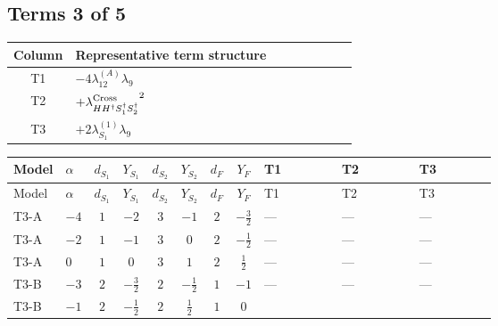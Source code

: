 \documentclass[8pt]{article}
\begin{document}
\begin{landscape}
\subsection*{Terms 3 of 5}
\begin{center}
\begin{tabular}{@{}c >{\raggedright\arraybackslash}p{0.82\linewidth}@{}}
\toprule
Column & Representative term structure \\
\midrule
T1 & \(\displaystyle -4 {\lambda_{12}^{(A)}} {\lambda_{9}}\) \\
\midrule
T2 & \(\displaystyle +{\lambda_{H H^\dagger S_1^\dagger S_2^\dagger}^{\rm Cross}}^2\) \\
\midrule
T3 & \(\displaystyle +2 {\lambda_{S_1}^{(1)}} {\lambda_{9}}\) \\
\midrule
\bottomrule
\end{tabular}
\end{center}
\smallskip
\tiny
\begin{longtable}{@{}llcccccc >{\raggedright\arraybackslash}p{0.21\linewidth} >{\raggedright\arraybackslash}p{0.21\linewidth} >{\raggedright\arraybackslash}p{0.21\linewidth}@{}}
\toprule
Model & $\alpha$ & $d_{S_1}$ & $Y_{S_1}$ & $d_{S_2}$ & $Y_{S_2}$ & $d_F$ & $Y_F$ & T1 & T2 & T3 \\
\midrule
\endfirsthead
\toprule
Model & $\alpha$ & $d_{S_1}$ & $Y_{S_1}$ & $d_{S_2}$ & $Y_{S_2}$ & $d_F$ & $Y_F$ & T1 & T2 & T3 \\
\midrule
\endhead
T3-A & $-4$ & $1$ & $-2$ & $3$ & $-1$ & $2$ & $-\frac{3}{2}$ & --- & --- & --- \\
\midrule
T3-A & $-2$ & $1$ & $-1$ & $3$ & $0$ & $2$ & $-\frac{1}{2}$ & --- & --- & --- \\
\midrule
T3-A & $0$ & $1$ & $0$ & $3$ & $1$ & $2$ & $\frac{1}{2}$ & --- & --- & --- \\
\midrule
T3-B & $-3$ & $2$ & $-\frac{3}{2}$ & $2$ & $-\frac{1}{2}$ & $1$ & $-1$ & --- & --- & --- \\
\midrule
T3-B & $-1$ & $2$ & $-\frac{1}{2}$ & $2$ & $\frac{1}{2}$ & $1$ & $0$ & \scriptsize\adjustbox{max width=\linewidth}{$\begin{gathered} -4 {\lambda_{12}^{(A)}} {\lambda_{9}}\end{gathered}$} & \scriptsize\adjustbox{max width=\linewidth}{$\begin{gathered} +{\lambda_{H H^\dagger S_1^\dagger S_2^\dagger}^{\rm Cross}}^2\end{gathered}$} & \scriptsize\adjustbox{max width=\linewidth}{$\begin{gathered} +2 {\lambda_{S_1}^{(1)}} {\lambda_{9}}\end{gathered}$} \\

\end{longtable}
\end{landscape}
\end{document}
